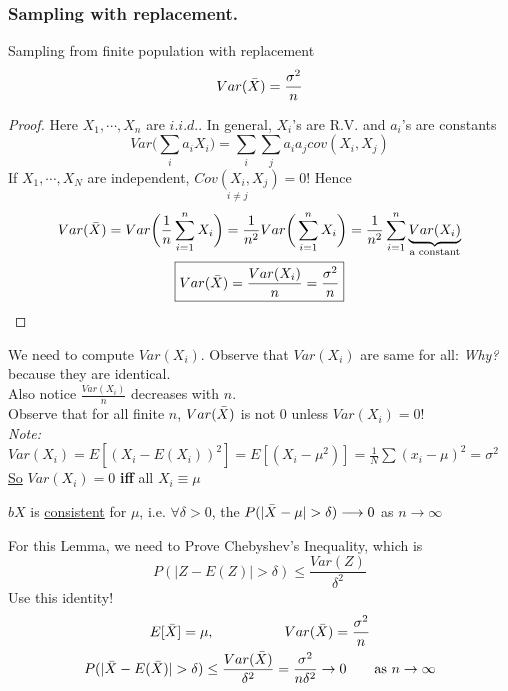 \subsubsection*{Sampling with replacement.}
\begin{theorem}
	Sampling from finite population with replacement
	\begin{equation*}
		Var(\bar{X}) = \frac{\sigma^2}{n}
	\end{equation*}	
\end{theorem}
\begin{proof}
Here $X_1, \cdots, X_n$ are $i.i.d.$. In general, $X_i$'s are R.V. and $a_i$'s are constants
\begin{equation*}
	Var\big(\sum_i a_i X_i\big) = \sum\limits_i \sum\limits_j a_i a_j cov(X_i, X_j) 
\end{equation*}
If $X_1, \cdots, X_N$ are independent, $\underset{i \neq j}{Cov(X_i, X_j)} = 0$! Hence
\begin{gather*}
	Var(\bar{X}) = Var\bigg(\frac{1}{n} \sum\limits_{i=1}^n X_i \bigg) = \frac{1}{n^2} Var\bigg( \sum\limits_{i=1}^n X_i \bigg) = \frac{1}{n^2}  \sum\limits_{i=1}^n \underbrace{Var(X_i)}_{\text{a constant}}\\
	\boxed{Var(\bar{X}) = \frac{Var(X_i)}{n} = \frac{\sigma^2}{n}}
\end{gather*}
\end{proof}
We need to compute $Var(X_i)$. Observe that $Var(X_i)$ are same for all: \textit{Why?} because they are identical.\\
Also notice $\frac{Var(X_i)}{n}$ decreases with $n$.\\
Observe that for all finite $n$, $Var(\bar{X})$ is not 0 unless $Var(X_i) = 0$!\\
\emph{Note:} $Var(X_i) = E[(X_i - E(X_i))^2] = E[(X_i - \mu^2)] = \frac{1}{N} \sum (x_i - \mu)^2 = \sigma^2$\\
\underline{So} $Var(X_i) = 0$ \textbf{iff} all $X_i \equiv \mu$
\begin{lemma}
	$bX$ is \underline{consistent} for $\mu$, i.e. $\forall \delta > 0$, the $P(|\bar{X} - \mu| > \delta) \longrightarrow 0$ as $n\rightarrow \infty$
\end{lemma}
For this Lemma, we need to Prove Chebyshev's Inequality, which is
\begin{equation*}
	P(|Z - E(Z)| > \delta) \leq \frac{Var(Z)}{\delta^2}
\end{equation*}
Use this identity!
\begin{gather*}
	E[\bar{X}] = \mu, \hspace{5em} Var(\bar{X}) = \frac{\sigma^2}{n}\\
	P(|\bar{X} - E(\bar{X})| > \delta) \leq \frac{Var(\bar{X})}{\delta^2} = \frac{\sigma^2}{n\delta^2} \rightarrow 0 \qquad \text{as } n \rightarrow \infty
\end{gather*}